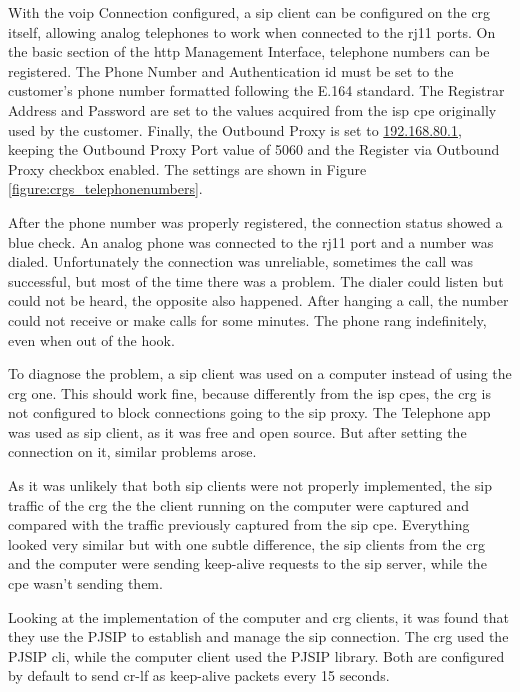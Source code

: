 With the \gls{voip} Connection configured, a \gls{sip} client can be configured on the \gls{crg} itself, allowing analog telephones to work when connected to the \gls{rj11} ports. On the basic section of the \gls{http} Management Interface, telephone numbers can be registered. The Phone Number and Authentication \gls{id} must be set to the customer’s phone number formatted following the E.164 standard. The Registrar Address and Password are set to the values acquired from the \gls{isp} \gls{cpe} originally used by the customer. Finally, the Outbound Proxy is set to \url{192.168.80.1}, keeping the Outbound Proxy Port value of 5060 and the Register via Outbound Proxy checkbox enabled. The settings are shown in Figure \ref{figure:crgs_telephonenumbers}.

After the phone number was properly registered, the connection status showed a blue check. An analog phone was connected to the \gls{rj11} port and a number was dialed. Unfortunately the connection was unreliable, sometimes the call was successful, but most of the time there was a problem. The dialer could listen but could not be heard, the opposite also happened. After hanging a call, the number could not receive or make calls for some minutes. The phone rang indefinitely, even when out of the hook.

To diagnose the problem, a \gls{sip} client was used on a computer instead of using the \gls{crg} one. This should work fine, because differently from the \gls{isp} \gls{cpe}s, the \gls{crg} is not configured to block connections going to the \gls{sip} proxy. The Telephone app was used as \gls{sip} client, as it was free and open source. But after setting the connection on it, similar problems arose.

As it was unlikely that both \gls{sip} clients were not properly implemented, the \gls{sip} traffic of the \gls{crg} the the client running on the computer were captured and compared with the traffic previously captured from the \gls{sip} \gls{cpe}. Everything looked very similar but with one subtle difference, the \gls{sip} clients from the \gls{crg} and the computer were sending keep-alive requests to the \gls{sip} server, while the \gls{cpe} wasn’t sending them.

Looking at the implementation of the computer and \gls{crg} clients, it was found that they use the PJSIP to establish and manage the \gls{sip} connection. The \gls{crg} used the PJSIP \gls{cli}, while the computer client used the PJSIP library. Both are configured by default to send \gls{cr}-\gls{lf} as keep-alive packets every 15 seconds.

